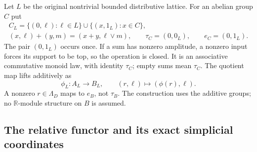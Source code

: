 Let $L$ be the original nontrivial bounded distributive lattice.
For an abelian group $C$ put
\begin{equation}\tag{SDKR2}
\begin{gathered}
C_L=\{(0,\ell):\ell\in L\}\cup\{(x,1_L):x\in C\},\\
(x,\ell)+(y,m)=(x+y,\ell\vee m),\qquad
\tau_C=(0,0_L),\qquad e_C=(0,1_L).
\end{gathered}
\end{equation}
The pair $(0,1_L)$ occurs once. If a sum has nonzero amplitude,
a nonzero input forces its support to be top, so the operation
is closed. It is an associative commutative monoid law, with
identity $\tau_C$; empty sums mean $\tau_C$.
The quotient map lifts additively as
\begin{equation}\tag{SDKR3}
\phi_L:A_L\to B_L,\qquad (r,\ell)\mapsto(\phi(r),\ell).
\end{equation}
A nonzero $r\in\Lambda_D$ maps to $e_B$, not $\tau_B$.
The construction uses the additive groups; no
$\mathbb R$-module structure on $B$ is assumed.

\subsection{The relative functor and its exact simplicial coordinates}


